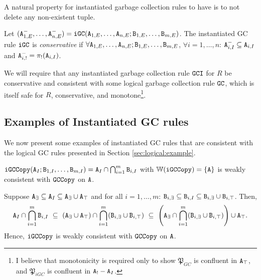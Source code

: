 A natural property for instantiated garbage collection rules to have is to not delete any non-existent tuple.

\begin{property}\label{property:instantiated_gc_conservative}
Let $(\tt{A}_{1,E}^-, \dots, \tt{A}_{n,E}^-) = \tt{iGC}(\tt{A}_{1,E}, \dots, \tt{A}_{n,E}; \tt{B}_{1,E}, \dots, \tt{B}_{m,E})$.
The instantiated GC rule $\tt{iGC}$ is \emph{conservative} if $\forall \tt{A}_{1,E}, \dots, \tt{A}_{n,E}; \tt{B}_{1,E}, \dots, \tt{B}_{m,E}$, $\forall i=1,\dots,n$: $\tt{A}_{i,I}^- \subseteq \tt{A}_{i,I}$ and $\tt{A}_{i,!}^- = \pi_!(\tt{A}_{i,I})$.
\end{property}

We will require that any instantiated garbage collection rule $\tt{GCI}$ for $R$ be conservative and consistent with some logical garbage collection rule $\tt{GC}$, which is itself safe for $R$, conservative, and monotone\footnote{
  I believe that monotonicity is required only to show $\mathfrak{P}_{GC}$ is confluent in $\tt{A}_\top$, and $\mathfrak{P}_{iGC}$ is confluent in $\tt{A}_! - \tt{A}_I$.
}.



\subsection{Examples of Instantiated GC rules}
We now present some examples of instantiated GC rules that are consistent with the logical GC rules presented in Section \ref{sec:logical:example}.

\begin{example}[Copy GC]
$\tt{iGCCopy}(\tt{A}_I; \tt{B}_{1,I}, \dots, \tt{B}_{m,I}) = \tt{A}_I \cap \bigcap_{i=1}^m \tt{B}_{i,I}$ with $\mathbb{W}(\tt{iGCCopy}) = \{\tt{A}\}$ is weakly consistent with $\tt{GCCopy}$ on $\tt{A}$.
\end{example}
Suppose
$\tt{A}_\exists \subseteq \tt{A}_I \subseteq \tt{A}_\exists \cup \tt{A}_\top$
and for all $i = 1, \dots, m$:
$\tt{B}_{i,\exists} \subseteq \tt{B}_{i,I} \subseteq \tt{B}_{i,\exists} \cup \tt{B}_{i,\top}$.
Then,
\begin{align*}
\tt{A}_I \cap \bigcap_{i=1}^m \tt{B}_{i,I}
~\subseteq~
(\tt{A}_\exists \cup \tt{A}_\top) \cap \bigcap_{i=1}^m (\tt{B}_{i,\exists} \cup \tt{B}_{i,\top})
~\subseteq~
\left(\tt{A}_\exists \cap \bigcap_{i=1}^m (\tt{B}_{i,\exists} \cup \tt{B}_{i,\top})\right)
\cup
\tt{A}_\top.
\end{align*}
Hence, $\tt{iGCCopy}$ is weakly consistent with $\tt{GCCopy}$ on $\tt{A}$.

